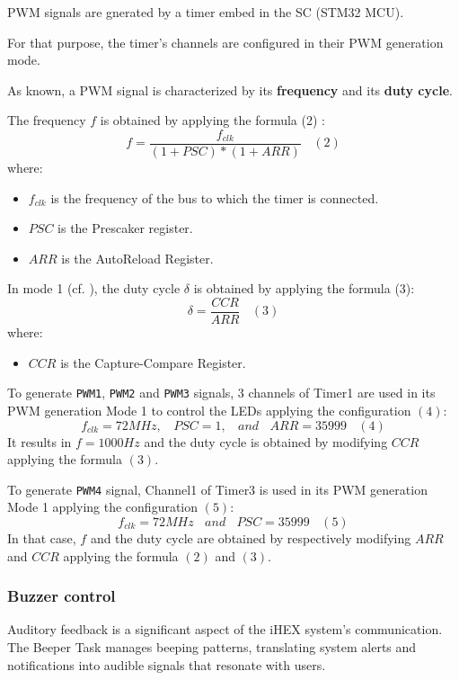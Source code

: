 \begin{adjustwidth}{2em}{0pt}
\begin{tcolorbox}[colback=yellow!10!white,colframe=yellow!50!black]
PWM signals are gnerated by a timer embed in the SC (STM32 MCU). 

For that purpose, the timer's channels are configured in their PWM generation mode.

As known, a PWM signal is characterized by its \textbf{frequency} and its \textbf{duty cycle}.

The frequency $f$ is obtained by applying the formula (2) \cite{R28}:
\[
f = \frac{f_{clk}}{(1+PSC)*(1+ARR)} ~~~~(2)
\]
where:
\begin{itemize}
    \item $f_{clk}$ is the frequency of the bus to which the timer is connected.
    \item $PSC$ is the Prescaker register.
    \item $ARR$ is the AutoReload Register.
\end{itemize}


In mode 1 (cf. \cite{R28}), the duty cycle $\delta$ is obtained by applying the formula (3):
\[
\delta = \frac{CCR}{ARR} ~~~~(3)
\]
where:
\begin{itemize}
    \item $CCR$ is the Capture-Compare Register.
\end{itemize}
\end{tcolorbox}
\captionsetup{type=rule}
\label{PWM generation}
\end{adjustwidth}

To generate \texttt{PWM1}, \texttt{PWM2} and  \texttt{PWM3} signals, 3 channels of Timer1 are used in its PWM generation Mode 1 to control the LEDs applying the configuration $(4)$:
\[
f_{clk} = 72MHz,~~~~ PSC = 1,~~~~ and~~~~ ARR = 35999 ~~~~ (4)
\]
It results in $f = 1000 Hz$ and the duty cycle is obtained by modifying $CCR$ applying the formula $(3)$.

To generate \texttt{PWM4} signal, Channel1 of Timer3 is used in its PWM generation Mode 1 applying the configuration $(5)$:
\[
f_{clk} = 72MHz ~~~~ and ~~~~ PSC = 35999 ~~~~ (5)
\]
In that case, $f$ and the duty cycle are obtained by respectively modifying $ARR$ and $CCR$ applying the formula $(2)$ and $(3)$.

\subsubsection{Buzzer control}
Auditory feedback is a significant aspect of the iHEX system's communication. The Beeper Task manages beeping patterns, translating system alerts and notifications into audible signals that resonate with users.

